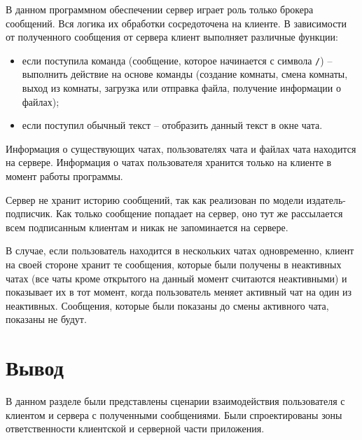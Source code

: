 В данном программном обеспечении сервер играет роль только брокера сообщений. Вся логика их обработки сосредоточена на клиенте. В зависимости от полученного сообщения от сервера клиент выполняет различные функции:

\begin{itemize}
	\item если поступила команда (сообщение, которое начинается с символа \texttt{/}) -- выполнить действие на основе команды (создание комнаты, смена комнаты, выход из комнаты, загрузка или отправка файла, получение информации о файлах);
	\item если поступил обычный текст -- отобразить данный текст в окне чата.
\end{itemize}

Информация о существующих чатах, пользователях чата и файлах чата находится на сервере. Информация о чатах пользователя хранится только на клиенте в момент работы программы.

Сервер не хранит историю сообщений, так как реализован по модели издатель-подписчик. Как только сообщение попадает на сервер, оно тут же рассылается всем подписанным клиентам и никак не запоминается на сервере.

В случае, если пользователь находится в нескольких чатах одновременно, клиент на своей стороне хранит те сообщения, которые были получены в неактивных чатах (все чаты кроме открытого на данный момент считаются неактивными) и показывает их в тот момент, когда пользователь меняет активный чат на один из неактивных. Сообщения, которые были показаны до смены активного чата, показаны не будут.

\section*{Вывод}

В данном разделе были представлены сценарии взаимодействия пользователя с клиентом и сервера с полученными сообщениями. Были спроектированы зоны ответственности клиентской и серверной части приложения.